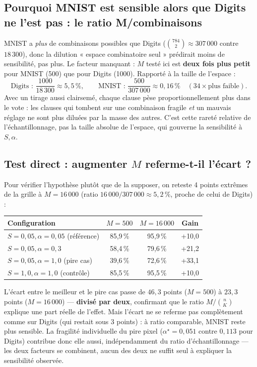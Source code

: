 \documentclass[12pt,a4paper]{article}
\theoremstyle{remark}
\begin{document}
\subsection{Pourquoi MNIST est sensible alors que Digits ne l'est pas : le ratio M/combinaisons}

MNIST a \emph{plus} de combinaisons possibles que Digits
($\binom{784}{2}\approx307\,000$ contre $18\,300$), donc la dilution
« espace combinatoire seul » prédirait moins de sensibilité, pas plus. Le
facteur manquant : $M$ testé ici est \textbf{deux fois plus petit} pour MNIST
(500) que pour Digits (1000). Rapporté à la taille de l'espace :
\[
  \text{Digits : } \frac{1000}{18\,300}\approx5{,}5\,\%,
  \qquad
  \text{MNIST : } \frac{500}{307\,000}\approx0{,}16\,\% \quad (34\times\text{plus faible}).
\]
Avec un tirage aussi clairsemé, chaque clause pèse proportionnellement plus
dans le vote : les clauses qui tombent sur une combinaison fragile \emph{et}
un mauvais réglage ne sont plus diluées par la masse des autres. C'est cette
rareté relative de l'échantillonnage, pas la taille absolue de l'espace, qui
gouverne la sensibilité à $S,\alpha$.

\subsection{Test direct : augmenter $M$ referme-t-il l'écart ?}

Pour vérifier l'hypothèse plutôt que de la supposer, on reteste 4 points
extrêmes de la grille à $M=16\,000$ (ratio $16\,000/307\,000\approx5{,}2\,\%$,
proche de celui de Digits) :

\begin{center}
\renewcommand{\arraystretch}{1.2}
\begin{tabular}{lccc}
\toprule
Configuration & $M=500$ & $M=16\,000$ & Gain \\
\midrule
$S{=}0{,}05,\alpha{=}0{,}05$ (référence) & 85,9\,\% & 95,9\,\% & +10,0 \\
$S{=}0{,}05,\alpha{=}0{,}3$              & 58,4\,\% & 79,6\,\% & +21,2 \\
$S{=}0{,}05,\alpha{=}1{,}0$ (pire cas)   & 39,6\,\% & 72,6\,\% & +33,1 \\
$S{=}1{,}0,\alpha{=}1{,}0$ (contrôle)    & 85,5\,\% & 95,5\,\% & +10,0 \\
\bottomrule
\end{tabular}
\end{center}

L'écart entre le meilleur et le pire cas passe de $46{,}3$ points ($M=500$) à
$23{,}3$ points ($M=16\,000$) --- \textbf{divisé par deux}, confirmant que le
ratio $M/\binom{n}{K}$ explique une part réelle de l'effet. Mais l'écart ne se
referme pas complètement comme sur Digits (qui restait sous $3$ points) : à
ratio comparable, MNIST reste plus sensible. La fragilité individuelle du pire
pixel ($\alpha^\star=0{,}051$ contre $0{,}113$ pour Digits) contribue donc
elle aussi, indépendamment du ratio d'échantillonnage --- les deux facteurs
se combinent, aucun des deux ne suffit seul à expliquer la sensibilité
observée.
\end{document}
